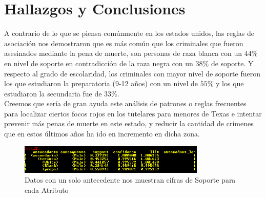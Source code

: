 \documentclass[sigconf]{acmart}
\begin{document}
\section{Hallazgos y Conclusiones}
A contrario de lo que se piensa comúnmente en los estados unidos, las reglas de asociación nos demostraron que es más común que los criminales que fueron asesinados mediante la pena de muerte, son personas de raza blanca con un $44\%$ en nivel de soporte en contradicción de la raza negra con un $38\%$ de soporte. Y respecto al grado de escolaridad, los criminales con mayor nivel de soporte fueron los que estudiaron la preparatoria (9-12 años) con un nivel de $55\%$ y los que estudiaron la secundaria fue de $33\%$.\\ Creemos que sería de gran ayuda este análisis de patrones o reglas frecuentes para localizar ciertos focos rojos en los tutelares para menores de Texas e intentar prevenir más penas de muerte en este estado, y reducir la cantidad de crímenes que en estos últimos años ha ido en incremento en dicha zona.
\begin{figure}[ht]
  \centering
  \includegraphics[width=3.5in]{independientes.PNG}
  \caption{Datos con un solo antecedente nos muestran cifras de Soporte para cada Atributo}
\end{figure}

{}


 
\end{document}
